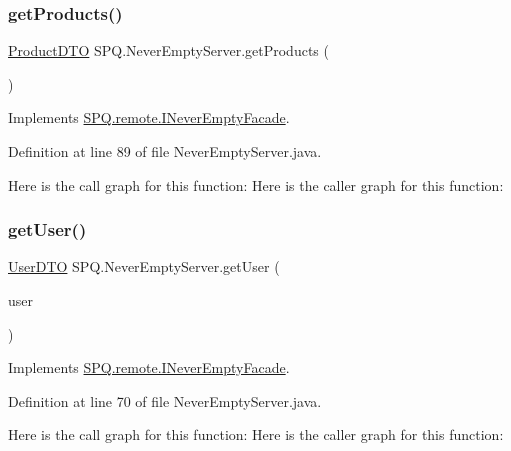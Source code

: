 \subsubsection{\texorpdfstring{get\+Products()}{getProducts()}}
{\footnotesize\ttfamily \mbox{\hyperlink{class_s_p_q_1_1dto_1_1_product_d_t_o}{Product\+D\+TO}} S\+P\+Q.\+Never\+Empty\+Server.\+get\+Products (\begin{DoxyParamCaption}{ }\end{DoxyParamCaption})}



Implements \mbox{\hyperlink{interface_s_p_q_1_1remote_1_1_i_never_empty_facade_a62d4a1747b8ba90f451fc9f9343055f3}{S\+P\+Q.\+remote.\+I\+Never\+Empty\+Facade}}.



Definition at line 89 of file Never\+Empty\+Server.\+java.

Here is the call graph for this function\+:
Here is the caller graph for this function\+:
\mbox{\label{class_s_p_q_1_1_never_empty_server_abb18bd0d72ecb8790068f206c592c58d}} 
\subsubsection{\texorpdfstring{get\+User()}{getUser()}}
{\footnotesize\ttfamily \mbox{\hyperlink{class_s_p_q_1_1dto_1_1_user_d_t_o}{User\+D\+TO}} S\+P\+Q.\+Never\+Empty\+Server.\+get\+User (\begin{DoxyParamCaption}\item[{\mbox{\hyperlink{class_s_p_q_1_1dto_1_1_user_d_t_o}{User\+D\+TO}}}]{user }\end{DoxyParamCaption})}



Implements \mbox{\hyperlink{interface_s_p_q_1_1remote_1_1_i_never_empty_facade_aa329dfc23ab0832e73802bf2df90b9e0}{S\+P\+Q.\+remote.\+I\+Never\+Empty\+Facade}}.



Definition at line 70 of file Never\+Empty\+Server.\+java.

Here is the call graph for this function\+:
Here is the caller graph for this function\+:
\mbox{\label{class_s_p_q_1_1_never_empty_server_a79e3b01cc25be204f24e01c7fccbef13}} 
